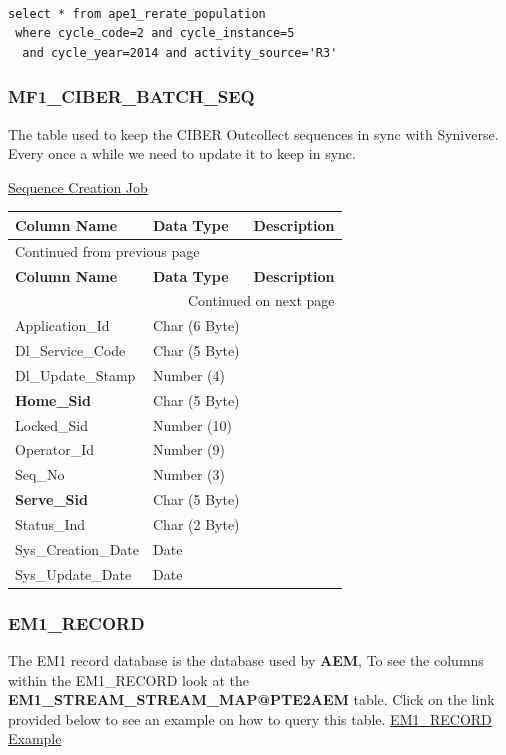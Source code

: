 \documentclass[12pt,twoside]{article}
\begin{document}
\begin{verbatim}

select * from ape1_rerate_population 
 where cycle_code=2 and cycle_instance=5 
  and cycle_year=2014 and activity_source='R3'
\end{verbatim}

\subsubsection{MF1\_CIBER\_BATCH\_SEQ}
\label{sec:orgheadline81}
The table used to keep the CIBER Outcollect sequences in sync
with Syniverse. Every once a while we need to update it to keep
in sync.

\href{file:///home/dbalchen/workspace/Outcollects/updateSeq.pl}{Sequence Creation Job}

\footnotesize
\begin{longtable}{l|l|l}
\hline
\textbf{Column Name} & \textbf{Data Type} & \textbf{Description}\\
\hline
\endfirsthead
\multicolumn{3}{l}{Continued from previous page} \\
\hline

\textbf{Column Name} & \textbf{Data Type} & \textbf{Description} \\

\hline
\endhead
\hline\multicolumn{3}{r}{Continued on next page} \\
\endfoot
\endlastfoot
\hline
Application\_Id & Char (6 Byte) & \\
Dl\_Service\_Code & Char (5 Byte) & \\
Dl\_Update\_Stamp & Number (4) & \\
\textbf{Home\_Sid} & Char (5 Byte) & \\
Locked\_Sid & Number (10) & \\
Operator\_Id & Number (9) & \\
Seq\_No & Number (3) & \\
\textbf{Serve\_Sid} & Char (5 Byte) & \\
Status\_Ind & Char (2 Byte) & \\
Sys\_Creation\_Date & Date & \\
Sys\_Update\_Date & Date & \\
\hline
\end{longtable}
\normalsize
\subsubsection{EM1\_RECORD}
\label{sec:orgheadline82}
The EM1 record database is the database used by \textbf{AEM}, To see the columns within the EM1\_RECORD look at the \textbf{EM1\_STREAM\_STREAM\_MAP@PTE2AEM} table.
Click on the link provided below to see an example on how to query this table.
     \href{file:///home/dbalchen/workspace/CommonPlace/docs/em1_example.sql}{EM1\_RECORD Example}
\end{document}
